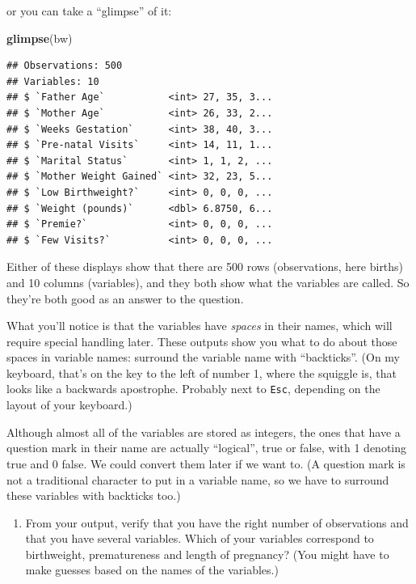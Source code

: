 \documentclass[]{tufte-book}
\newenvironment{Shaded}{}{}
\newcommand{\KeywordTok}[1]{\textcolor[rgb]{0.00,0.44,0.13}{\textbf{#1}}}
\newcommand{\NormalTok}[1]{#1}
\providecommand{\tightlist}{%
  \setlength{\itemsep}{0pt}\setlength{\parskip}{0pt}}
\theoremstyle{definition}
\theoremstyle{definition}
\theoremstyle{definition}
\theoremstyle{remark}
\begin{document}
or you can take a ``glimpse'' of it:

\begin{Shaded}
\begin{Highlighting}[]
\KeywordTok{glimpse}\NormalTok{(bw)}
\end{Highlighting}
\end{Shaded}

\begin{verbatim}
## Observations: 500
## Variables: 10
## $ `Father Age`           <int> 27, 35, 3...
## $ `Mother Age`           <int> 26, 33, 2...
## $ `Weeks Gestation`      <int> 38, 40, 3...
## $ `Pre-natal Visits`     <int> 14, 11, 1...
## $ `Marital Status`       <int> 1, 1, 2, ...
## $ `Mother Weight Gained` <int> 32, 23, 5...
## $ `Low Birthweight?`     <int> 0, 0, 0, ...
## $ `Weight (pounds)`      <dbl> 6.8750, 6...
## $ `Premie?`              <int> 0, 0, 0, ...
## $ `Few Visits?`          <int> 0, 0, 0, ...
\end{verbatim}

Either of these displays show that there are 500 rows (observations,
here births) and 10 columns (variables), and they both show what the
variables are called. So they're both good as an answer to the question.

What you'll notice is that the variables have \emph{spaces} in their
names, which will require special handling later. These outputs show you
what to do about those spaces in variable names: surround the variable
name with ``backticks''. (On my keyboard, that's on the key to the left
of number 1, where the squiggle is, that looks like a backwards
apostrophe. Probably next to \texttt{Esc}, depending on the layout of
your keyboard.)

Although almost all of the variables are stored as integers, the ones
that have a question mark in their name are actually ``logical'', true
or false, with 1 denoting true and 0 false. We could convert them later
if we want to. (A question mark is not a traditional character to put in
a variable name, so we have to surround these variables with backticks
too.)

\begin{enumerate}
\def\labelenumi{(\alph{enumi})}
\setcounter{enumi}{1}
\tightlist
\item
  From your output, verify that you have the right number of
  observations and that you have several variables. Which of your
  variables correspond to birthweight, prematureness and length of
  pregnancy? (You might have to make guesses based on the names of the
  variables.)
\end{enumerate}
\end{document}
